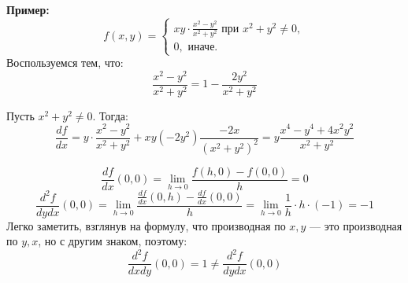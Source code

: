 \textbf{Пример:}
$$
f(x, y) = \begin{cases}
    xy \cdot \frac{x^2 - y^2}{x^2 + y^2} \text{ при } x^2 + y^2 \neq 0,\\
    0, \text{ иначе.}
\end{cases}
$$
Воспользуемся тем, что:
$$\frac{x^2 - y^2}{x^2 + y^2} = 1 - \frac{2y^2}{x^2 + y^2}$$

Пусть $x^2 + y^2 \neq 0$. Тогда:
$$\frac{df}{dx} = y \cdot \frac{x^2 - y^2}{x^2 + y^2} + 
xy(-2y^2) \frac{-2x}{(x^2 + y^2)^2} =
y\frac{x^4 - y^4 + 4x^2y^2}{x^2 + y^2}$$

$$\frac{df}{dx}(0, 0) = \lim_{h \to 0} \frac{f(h, 0) - f(0, 0)}{h} = 0$$
$$\frac{d^2f}{dy dx} (0, 0) = \lim_{h \to 0} 
\frac{\frac{df}{dx}(0, h) - \frac{df}{dx}(0, 0)}{h} =
\lim_{h \to 0} \frac{1}{h} \cdot h \cdot (-1) = -1
$$
Легко заметить, взглянув на формулу, что производная по $x, y$ ---
это производная по $y, x$, но с другим знаком, поэтому:
$$\frac{d^2f}{dx dy} (0, 0) = 1 \neq \frac{d^2f}{dy dx} (0, 0)$$

